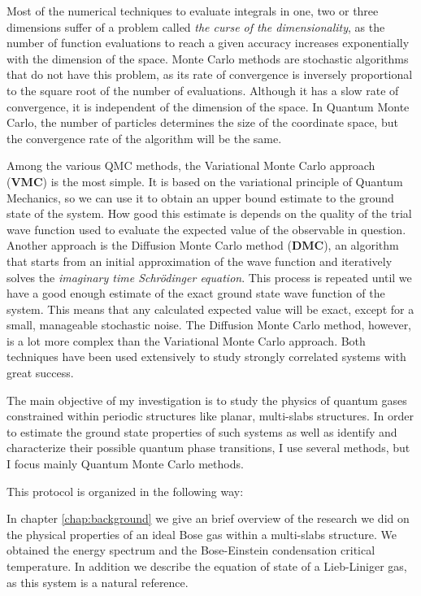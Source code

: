 Most of the numerical techniques to evaluate integrals in one, two or three
dimensions suffer of a problem called \textit{the curse of the dimensionality},
as the number of function evaluations to reach a given accuracy increases
exponentially with the dimension of the space. Monte Carlo methods are
stochastic algorithms that do not have this problem, as its rate of convergence
is inversely proportional to the square root of the number of evaluations.
Although it has a slow rate of convergence, it is independent of the dimension
of the space. In Quantum Monte Carlo, the number of particles determines the
size of the coordinate space, but the convergence rate of the algorithm will be
the same.

Among the various QMC methods, the Variational Monte Carlo approach
({\textbf{VMC}}) is the most simple. It is based on the variational principle of
Quantum Mechanics, so we can use it to obtain an upper bound estimate to the
ground state of the system. How good this estimate is depends on the quality of
the trial wave function used to evaluate the expected value of the observable in
question. Another approach is the Diffusion Monte Carlo method (\textbf{DMC}),
an algorithm that starts from an initial approximation of the wave function and
iteratively solves the \textit{imaginary time Schrödinger equation}. This
process is repeated until we have a good enough estimate of the exact ground
state wave function of the system. This means that any calculated expected value
will be exact, except for a small, manageable stochastic noise. The Diffusion
Monte Carlo method, however, is a lot more complex than the Variational Monte
Carlo approach. Both techniques have been used extensively to study strongly
correlated systems
\cite{bib:boronat-phys-rev-B.49.8920.1994,bib:casurellas-phys-rev-B.52.3654.1995,
bib:astrakharchik-phys-rev-a.68.031602.2003,
bib:astrakharchik-phys.rev.lett.95.190407.2005} with great success.

The main objective of my investigation is to study the physics of quantum gases
constrained within periodic structures like planar, multi-slabs structures. In
order to estimate the ground state properties of such systems as well as
identify and characterize their possible quantum phase transitions, I use
several methods, but I focus mainly Quantum Monte Carlo methods.

This protocol is organized in the following way:

In chapter \ref{chap:background} we give an brief overview of the research we
did on the physical properties of an ideal Bose gas within a multi-slabs
structure. We obtained the energy spectrum and the Bose-Einstein condensation
critical temperature.
In addition we describe the equation of state of a Lieb-Liniger gas, as this
system is a natural reference.

